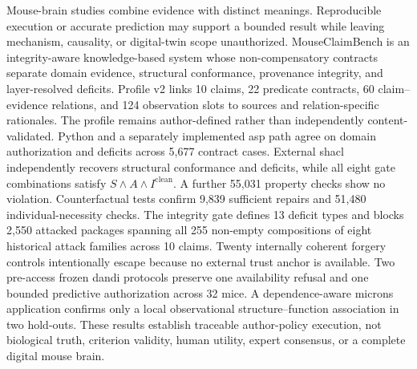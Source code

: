 Mouse-brain studies combine evidence with distinct meanings. Reproducible execution or accurate prediction may support a bounded result while leaving mechanism, causality, or digital-twin scope unauthorized. MouseClaimBench is an integrity-aware knowledge-based system whose non-compensatory contracts separate domain evidence, structural conformance, provenance integrity, and layer-resolved deficits. Profile v2 links 10 claims, 22 predicate contracts, 60 claim--evidence relations, and 124 observation slots to sources and relation-specific rationales. The profile remains author-defined rather than independently content-validated. Python and a separately implemented \ac{asp} path agree on domain authorization and deficits across 5,677 contract cases. External \ac{shacl} independently recovers structural conformance and deficits, while all eight gate combinations satisfy $S\land A\land I^{\mathrm{clean}}$. A further 55,031 property checks show no violation. Counterfactual tests confirm 9,839 sufficient repairs and 51,480 individual-necessity checks. The integrity gate defines 13 deficit types and blocks 2,550 attacked packages spanning all 255 non-empty compositions of eight historical attack families across 10 claims. Twenty internally coherent forgery controls intentionally escape because no external trust anchor is available. Two pre-access frozen \ac{dandi} protocols preserve one availability refusal and one bounded predictive authorization across 32 mice. A dependence-aware \ac{microns} application confirms only a local observational structure--function association in two hold-outs. These results establish traceable author-policy execution, not biological truth, criterion validity, human utility, expert consensus, or a complete digital mouse brain.
